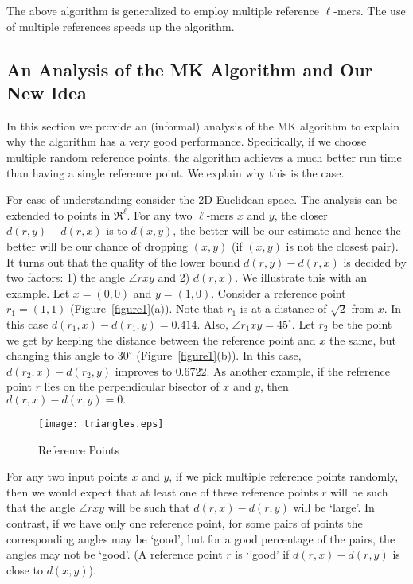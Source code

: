 \documentclass{article}
\theoremstyle{definition}
\theoremstyle{remark}
\begin{document}
The above algorithm is generalized to employ multiple reference $\ell$-mers. The use of multiple references speeds up the algorithm.

\subsection{An Analysis of the MK Algorithm and Our New Idea}
In this section we provide an (informal) analysis of the MK algorithm to explain why the algorithm has a very good performance. Specifically, if we choose multiple random reference points, the algorithm achieves a much better run time than having a single reference point. We explain why this is the case.

For ease of understanding consider the 2D Euclidean space. The analysis can be extended to points in $\Re^\ell$. For any two $\ell$-mers $x$ and $y$, the closer $d(r,y)-d(r,x)$ is to $d(x,y)$, the better will be our estimate and hence the better will be our chance of dropping $(x,y)$ (if $(x,y)$ is not the closest pair). It turns out that the quality of the lower bound $d(r,y)-d(r,x)$ is decided by two factors: 1) the angle $\angle rxy$ and 2) $d(r,x)$. We illustrate this with an example. Let $x=(0,0)$ and $y=(1,0)$. Consider a reference point $r_1=(1,1)$ (Figure~\ref{figure1}(a)). Note that $r_1$ is at a distance of $\sqrt 2$ from $x$. In this case $d(r_1,x)-d(r_1,y)=0.414$. Also, $\angle r_1xy=45^\circ$. Let $r_2$ be the point we get by keeping the distance between the reference point and $x$ the same, but changing this angle to $30^\circ$ (Figure~\ref{figure1}(b)). In this case,  $d(r_2,x)-d(r_2,y)$ improves to $0.6722$. As another example, if the reference point $r$ lies on the perpendicular bisector of $x$ and $y$, then $d(r,x)-d(r,y)=0.$

\begin{figure}[h]
\texttt{[image: triangles.eps]}
\caption{Reference Points}\label{figure1}
\label{fig:1}       \end{figure}

For any two input points $x$ and $y$, if we pick multiple reference points randomly, then we would expect that at least one of these reference points $r$ will be such that the angle $\angle rxy$ will be such that $d(r,x)-d(r,y)$ will be `large'. In contrast, if we have only one reference point, for some pairs of points the corresponding angles may be `good', but for a good percentage of the pairs, the angles may not be `good'. (A reference point $r$ is `'good' if $d(r,x)-d(r,y)$ is close to $d(x,y)$).
\end{document}

